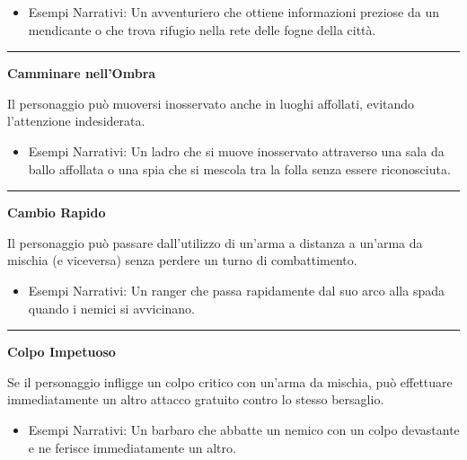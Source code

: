 \documentclass[../manuale_main.tex]{subfiles}
\begin{document}
\begin{itemize}
\item Esempi Narrativi: Un avventuriero che ottiene informazioni preziose da un mendicante o che trova rifugio nella rete delle fogne della città.
\end{itemize}

\vspace{0.5cm}\rule{\textwidth}{0.4pt}\vspace{1cm}

\begin{center}
\textbf{\large{Camminare nell’Ombra}}\\
\end{center}
Il personaggio può muoversi inosservato anche in luoghi affollati, evitando l’attenzione indesiderata.

\begin{itemize}
\item Esempi Narrativi: Un ladro che si muove inosservato attraverso una sala da ballo affollata o una spia che si mescola tra la folla senza essere riconosciuta.
\end{itemize}

\vspace{0.5cm}\rule{\textwidth}{0.4pt}\vspace{1cm}

\begin{center}
\textbf{\large{Cambio Rapido}}\\
\end{center}
Il personaggio può passare dall’utilizzo di un’arma a distanza a un’arma da mischia (e viceversa) senza perdere un turno di combattimento.

\begin{itemize}
\item Esempi Narrativi: Un ranger che passa rapidamente dal suo arco alla spada quando i nemici si avvicinano.
\end{itemize}

\vspace{0.5cm}\rule{\textwidth}{0.4pt}\vspace{1cm}

\begin{center}
\textbf{\large{Colpo Impetuoso}}\\
\end{center}
Se il personaggio infligge un colpo critico con un'arma da mischia, può effettuare immediatamente un altro attacco gratuito contro lo stesso bersaglio.

\begin{itemize}
\item Esempi Narrativi: Un barbaro che abbatte un nemico con un colpo devastante e ne ferisce immediatamente un altro.
\end{itemize}
\end{document}
